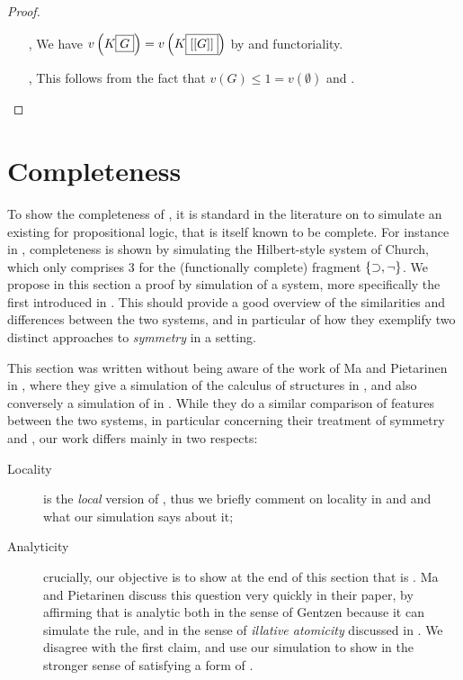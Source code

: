 \begin{scope}
\begin{scope}
\begin{proof}
\begin{itemize}
    \item[\kl{Dcut{\da}}, \kl{Dcut{\ua}}] We have
    $v\left(K\fbox{$G$}\right) = v\left(K\fbox{$[[G]]$}\right)$ by
     and functoriality.

    \item[\kl{Ins}, \kl{Del}] This follows from the fact that $v(G) \leq 1 =
    v(\emptyset)$ and .
  \end{itemize}
\end{proof}

\section{Completeness}

To show the completeness of , it is standard in the literature on 
to simulate an existing  for  propositional logic, that is
itself known to be complete. For instance in \cite{Roberts+1973}, completeness
is shown by simulating the Hilbert-style system  of Church, which only
comprises 3  for the (functionally complete) fragment $\{\supset, \neg\}$.
We propose in this section a proof by simulation of a \emph{}
system, more specifically the   first introduced
in . This should provide a good overview of the
similarities and differences between the two systems, and in particular of how
they exemplify two distinct approaches to \emph{symmetry} in a 
setting.

\begin{kaonote}
  This section was written without being aware of the work of Ma and Pietarinen
  in , where they give a simulation of the calculus of
  structures  in , and also conversely a simulation of
   in . While they do a similar comparison of features
  between the two systems, in particular concerning their treatment of symmetry
  and , our work differs mainly in two respects:
  \begin{description}
    \item[Locality]  is the \emph{local} version of , thus we
    briefly comment on locality in  and  and what our
    simulation says about it;
    \item[Analyticity] crucially, our objective is to show at the end of this
    section that  is \emph{}. Ma and Pietarinen discuss
    this question very quickly in their paper, by affirming that  is
    analytic both in the sense of Gentzen because it can simulate the 
    rule, and in the sense of \emph{illative atomicity} discussed in
    . We disagree with the first claim, and use our simulation
    to show  in the stronger sense of satisfying a form of
    .
  \end{description}
\end{kaonote}


\end{scope}
\end{scope}
